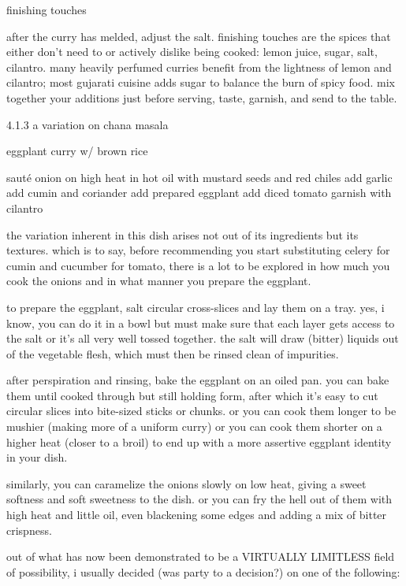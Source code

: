 \begin{algorithm}
  \item finishing touches

  after the curry has melded, adjust the salt. finishing touches are the spices 
  that either don't need to or actively dislike being cooked: lemon juice, 
  sugar, salt, cilantro. many heavily perfumed curries benefit from the 
  lightness of lemon and cilantro; most gujarati cuisine adds sugar to balance 
  the burn of spicy food. mix together your additions just before serving, 
  taste, garnish, and send to the table.
\end{algorithm}

4.1.3  a variation on chana masala

eggplant curry w/ brown rice

saut\'{e} onion on high heat in hot oil with mustard seeds and red chiles
add garlic
add cumin and coriander
add prepared eggplant
add diced tomato
garnish with cilantro

the variation inherent in this dish arises not out of its ingredients but its textures. which is to say, before recommending you start substituting celery for cumin and cucumber for tomato, there is a lot to be explored in how much you cook the onions and in what manner you prepare the eggplant. 

to prepare the eggplant, salt circular cross-slices and lay them on a tray. yes, i know, you can do it in a bowl but must make sure that each layer gets access to the salt or it's all very well tossed together. the salt will draw (bitter) liquids out of the vegetable flesh, which must then be rinsed clean of impurities. 

after perspiration and rinsing, bake the eggplant on an oiled pan. you can bake them until cooked through but still holding form, after which it's easy to cut circular slices into bite-sized sticks or chunks. or you can cook them longer to be mushier (making more of a uniform curry) or you can cook them shorter on a higher heat (closer to a broil) to end up with a more assertive eggplant identity in your dish. 

similarly, you can caramelize the onions slowly on low heat, giving a sweet softness and soft sweetness to the dish. or you can fry the hell out of them with high heat and little oil, even blackening some edges and adding a mix of bitter crispness. 

out of what has now been demonstrated to be a VIRTUALLY LIMITLESS field of possibility, i usually decided (was party to a decision?) on one of the following:


